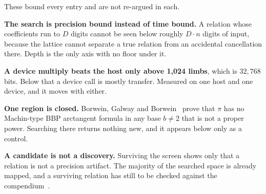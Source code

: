 These bound every entry and are not re-argued in each.

\textbf{The search is precision bound instead of time bound.} A relation whose coefficients run to \(D\)
digits cannot be seen below roughly \(D \cdot n\) digits of input, because the lattice cannot separate a
true relation from an accidental cancellation there. Depth is the only axis with no floor under it.

\textbf{A device multiply beats the host only above 1,024 limbs}, which is \(32{,}768\) bits. Below
that a device call is mostly transfer. Measured on one host and one device, and it moves with either.

\textbf{One region is closed.} Borwein, Galway and Borwein~\cite{src:Borwein} prove that \(\pi\) has no
Machin-type BBP arctangent formula in any base \(b \neq 2\) that is not a proper power. Searching there
returns nothing new, and it appears below only as a control.

\textbf{A candidate is not a discovery.} Surviving the screen shows only that a relation is not a
precision artifact. The majority of the searched space is already mapped, and a surviving relation has still
to be checked against the compendium~\cite{src:Bailey-2023}.
